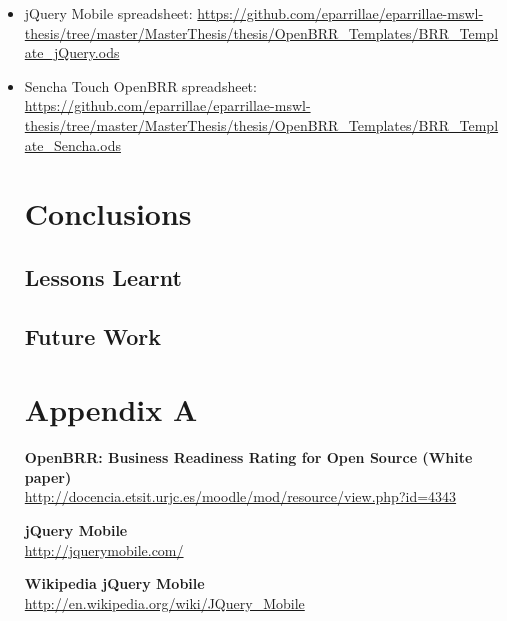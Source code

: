 \documentclass[a4paper,12pt]{book}
\begin{document}
\begin{itemize}
 \item jQuery Mobile spreadsheet:
\url{
https://github.com/eparrillae/eparrillae-mswl-thesis/tree/master/MasterThesis/thesis/OpenBRR_Templates/BRR_Template_jQuery.ods}

 \item Sencha Touch OpenBRR spreadsheet:
\url{
https://github.com/eparrillae/eparrillae-mswl-thesis/tree/master/MasterThesis/thesis/OpenBRR_Templates/BRR_Template_Sencha.ods}



\chapter{Conclusions}
\label{chap:conclusions}


\section{Lessons Learnt}
\label{sec:lessons}


\section{Future Work}
\label{sec:future}


\appendix
\chapter{Appendix A}
\label{app:appenda}

\begin{thebibliography}{25}
 

\textbf{OpenBRR: Business Readiness Rating for
Open Source (White paper)}\\
{\footnotesize\url{
http://docencia.etsit.urjc.es/moodle/mod/resource/view.php?id=4343}}

\textbf{jQuery Mobile}\\
{\footnotesize\url{http://jquerymobile.com/}}

\textbf{Wikipedia jQuery Mobile}\\
{\footnotesize\url{http://en.wikipedia.org/wiki/JQuery_Mobile}}


\end{thebibliography}
\end{itemize}
\end{document}
